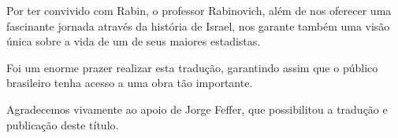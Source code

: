 Por ter convivido com Rabin, o professor Rabinovich, além de nos
oferecer uma fascinante jornada através da história de Israel, nos
garante também uma visão única sobre a vida de um de seus maiores
estadistas.

Foi um enorme prazer realizar esta tradução, garantindo assim que o
público brasileiro tenha acesso a uma obra tão importante.

Agradecemos vivamente ao apoio de Jorge Feffer, que possibilitou a
tradução e publicação deste título.



